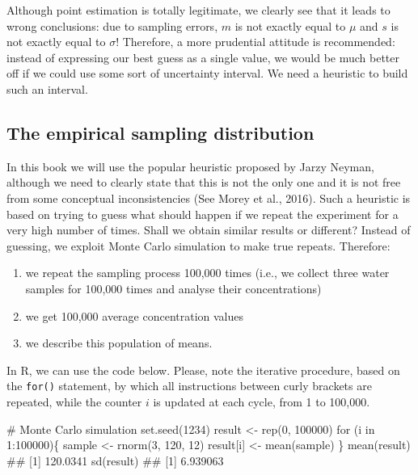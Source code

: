 \documentclass[a4paper,12pt,oneside]{book}
\providecommand{\tightlist}{%
  \setlength{\itemsep}{0pt}\setlength{\parskip}{0pt}}
\newenvironment{Shaded}{\begin{snugshade}}{\end{snugshade}}
\newcommand{\DecValTok}[1]{#1}
\newcommand{\SpecialCharTok}[1]{#1}
\newcommand{\CommentTok}[1]{#1}
\newcommand{\DocumentationTok}[1]{#1}
\newcommand{\OtherTok}[1]{#1}
\newcommand{\FunctionTok}[1]{#1}
\newcommand{\ControlFlowTok}[1]{#1}
\newcommand{\NormalTok}[1]{#1}
\begin{document}
Although point estimation is totally legitimate, we clearly see that it leads to wrong conclusions: due to sampling errors, \(m\) is not exactly equal to \(\mu\) and \(s\) is not exactly equal to \(\sigma\)! Therefore, a more prudential attitude is recommended: instead of expressing our best guess as a single value, we would be much better off if we could use some sort of uncertainty interval. We need a heuristic to build such an interval.

\hypertarget{the-empirical-sampling-distribution}{%
\subsection{The empirical sampling distribution}\label{the-empirical-sampling-distribution}}

In this book we will use the popular heuristic proposed by Jarzy Neyman, although we need to clearly state that this is not the only one and it is not free from some conceptual inconsistencies (See Morey et al., 2016). Such a heuristic is based on trying to guess what should happen if we repeat the experiment for a very high number of times. Shall we obtain similar results or different? Instead of guessing, we exploit Monte Carlo simulation to make true repeats. Therefore:

\begin{enumerate}
\def\labelenumi{\arabic{enumi}.}
\tightlist
\item
  we repeat the sampling process 100,000 times (i.e., we collect three water samples for 100,000 times and analyse their concentrations)
\item
  we get 100,000 average concentration values
\item
  we describe this population of means.
\end{enumerate}

In R, we can use the code below. Please, note the iterative procedure, based on the \texttt{for()} statement, by which all instructions between curly brackets are repeated, while the counter \(i\) is updated at each cycle, from 1 to 100,000.

\begin{Shaded}
\begin{Highlighting}[]
\CommentTok{\# Monte Carlo simulation}
\FunctionTok{set.seed}\NormalTok{(}\DecValTok{1234}\NormalTok{)}
\NormalTok{result }\OtherTok{\textless{}{-}} \FunctionTok{rep}\NormalTok{(}\DecValTok{0}\NormalTok{, }\DecValTok{100000}\NormalTok{)}
\ControlFlowTok{for}\NormalTok{ (i }\ControlFlowTok{in} \DecValTok{1}\SpecialCharTok{:}\DecValTok{100000}\NormalTok{)\{}
\NormalTok{  sample }\OtherTok{\textless{}{-}} \FunctionTok{rnorm}\NormalTok{(}\DecValTok{3}\NormalTok{, }\DecValTok{120}\NormalTok{, }\DecValTok{12}\NormalTok{)}
\NormalTok{  result[i] }\OtherTok{\textless{}{-}} \FunctionTok{mean}\NormalTok{(sample)}
\NormalTok{\}}
\FunctionTok{mean}\NormalTok{(result)}
\DocumentationTok{\#\# [1] 120.0341}
\FunctionTok{sd}\NormalTok{(result)}
\DocumentationTok{\#\# [1] 6.939063}
\end{Highlighting}
\end{Shaded}
\end{document}

